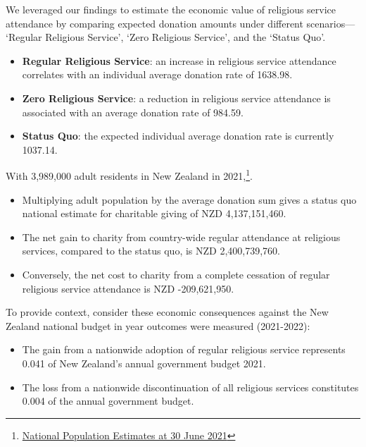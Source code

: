 \documentclass[
  single column]{article}
\providecommand{\tightlist}{%
  \setlength{\itemsep}{0pt}\setlength{\parskip}{0pt}}\usepackage{longtable,booktabs,array}
\begin{document}
We leveraged our findings to estimate the economic value of religious
service attendance by comparing expected donation amounts under
different scenarios--- `Regular Religious Service', `Zero Religious
Service', and the `Status Quo'.

\begin{itemize}
\tightlist
\item
  \textbf{Regular Religious Service}: an increase in religious service
  attendance correlates with an individual average donation rate of
  1638.98.
\item
  \textbf{Zero Religious Service}: a reduction in religious service
  attendance is associated with an average donation rate of 984.59.
\item
  \textbf{Status Quo}: the expected individual average donation rate is
  currently 1037.14.
\end{itemize}

With 3,989,000 adult residents in New Zealand in 2021,\footnote{\href{https://www.stats.govt.nz/information-releases/national-population-estimates-at-30-june-2021}{National
  Population Estimates at 30 June 2021}}.

\begin{itemize}
\tightlist
\item
  Multiplying adult population by the average donation sum gives a
  status quo national estimate for charitable giving of NZD
  4,137,151,460.
\item
  The net gain to charity from country-wide regular attendance at
  religious services, compared to the status quo, is NZD 2,400,739,760.
\item
  Conversely, the net cost to charity from a complete cessation of
  regular religious service attendance is NZD -209,621,950.
\end{itemize}

To provide context, consider these economic consequences against the New
Zealand national budget in year outcomes were measured (2021-2022):

\begin{itemize}
\tightlist
\item
  The gain from a nationwide adoption of regular religious service
  represents 0.041 of New Zealand's annual government budget 2021.
\item
  The loss from a nationwide discontinuation of all religious services
  constitutes 0.004 of the annual government budget.
\end{itemize}
\end{document}

